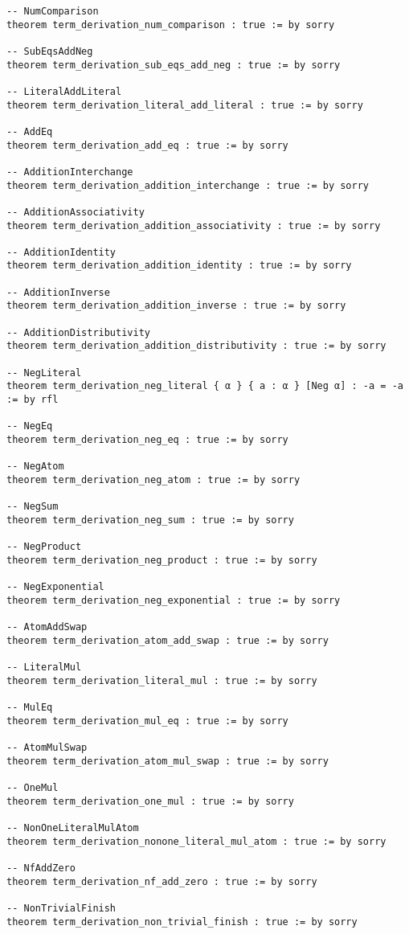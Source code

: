 \documentclass{article}
\begin{document}
\begin{tcolorbox}[colback=white!10, width=\linewidth]
\begin{lstlisting}[language=Lean4]
-- NumComparison
theorem term_derivation_num_comparison : true := by sorry

-- SubEqsAddNeg
theorem term_derivation_sub_eqs_add_neg : true := by sorry

-- LiteralAddLiteral
theorem term_derivation_literal_add_literal : true := by sorry

-- AddEq
theorem term_derivation_add_eq : true := by sorry

-- AdditionInterchange
theorem term_derivation_addition_interchange : true := by sorry

-- AdditionAssociativity
theorem term_derivation_addition_associativity : true := by sorry

-- AdditionIdentity
theorem term_derivation_addition_identity : true := by sorry

-- AdditionInverse
theorem term_derivation_addition_inverse : true := by sorry

-- AdditionDistributivity
theorem term_derivation_addition_distributivity : true := by sorry

-- NegLiteral
theorem term_derivation_neg_literal { α } { a : α } [Neg α] : -a = -a := by rfl

-- NegEq
theorem term_derivation_neg_eq : true := by sorry

-- NegAtom
theorem term_derivation_neg_atom : true := by sorry

-- NegSum
theorem term_derivation_neg_sum : true := by sorry

-- NegProduct
theorem term_derivation_neg_product : true := by sorry

-- NegExponential
theorem term_derivation_neg_exponential : true := by sorry

-- AtomAddSwap
theorem term_derivation_atom_add_swap : true := by sorry

-- LiteralMul
theorem term_derivation_literal_mul : true := by sorry

-- MulEq
theorem term_derivation_mul_eq : true := by sorry

-- AtomMulSwap
theorem term_derivation_atom_mul_swap : true := by sorry

-- OneMul
theorem term_derivation_one_mul : true := by sorry

-- NonOneLiteralMulAtom
theorem term_derivation_nonone_literal_mul_atom : true := by sorry

-- NfAddZero
theorem term_derivation_nf_add_zero : true := by sorry

-- NonTrivialFinish
theorem term_derivation_non_trivial_finish : true := by sorry


\end{lstlisting}
\end{tcolorbox}
\end{document}
